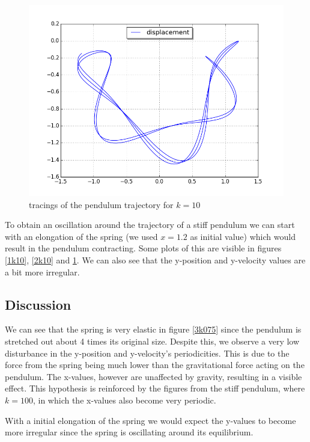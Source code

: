 \documentclass[a4paper,11pt]{article}
\theoremstyle{mytheor}
\begin{document}
\begin{figure}[!h]
\centering
\includegraphics[scale=0.5]{task1_k10_utdrag12_3.png}
\caption{tracings of the pendulum trajectory for $k = 10$}
\label{3k10}
\end{figure}

To obtain an oscillation around the trajectory of a stiff pendulum we can start with an elongation of the spring (we used $x = 1.2$ as initial value) which would result in the pendulum contracting. Some plots of this are visible in figures \ref{1k10}, \ref{2k10} and \ref{3k10}. We can also see that the y-position and y-velocity values are a bit more irregular.

\subsection*{Discussion}
We can see that the spring is very elastic in figure \ref{3k075} since the pendulum is stretched out about 4 times its original size. Despite this, we observe a very low disturbance in the y-position and y-velocity's periodicities. This is due to the force from the spring being much lower than the gravitational force acting on the pendulum. The x-values, however are unaffected by gravity, resulting in a visible effect. This hypothesis is reinforced by the figures from the stiff pendulum, where $k = 100$, in which the x-values also become very periodic.

With a initial elongation of the spring we would expect the y-values to become more irregular since the spring is oscillating around its equilibrium.
\end{document}
